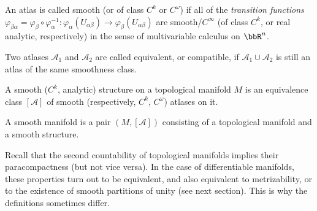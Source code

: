 \begin{defn}
An atlas is called smooth (or of class $C^k$ or $C^\omega$) if all of the \emph{transition functions} $\varphi_{\beta\alpha}=\varphi_\beta\circ\varphi_\alpha^{-1}:\varphi_\alpha(U_{\alpha\beta})\to\varphi_\beta(U_{\alpha\beta})$ are smooth/$C^\infty$ (of class $C^k$, or real analytic, respectively) in the sense of multivariable calculus on $\bbR^n$.
\end{defn}
\begin{defn}
Two atlases $\mathcal{A}_1$ and $\mathcal{A}_2$ are called equivalent, or compatible, if $\mathcal{A}_1\cup\mathcal{A}_2$ is still an atlas of the same smoothness class.
\end{defn}
\begin{defn}
A smooth ($C^k$, analytic) structure on a topological manifold $M$ is an equivalence class $[\mathcal{A}]$ of smooth (respectively, $C^k$, $C^\omega$) atlases on it. 
\end{defn}
\begin{defn}
A smooth manifold is a pair $(M,[\mathcal{A}])$ consisting of a topological manifold and a smooth structure.
\end{defn}

\begin{rem}
    Recall that the second countability of topological manifolds implies their paracompactness (but not vice versa). In the case of differentiable manifolds, these properties turn out to be equivalent, and also equivalent to metrizability, or to the existence of smooth partitions of unity (see next section). This is why the definitions sometimes differ.
\end{rem}

